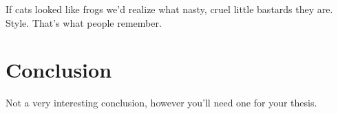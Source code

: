 \begin{savequote}[45mm]
If cats looked like frogs we'd realize what nasty, cruel little bastards they are. Style. That's what people remember.
\end{savequote}

\chapter{Conclusion}

Not a very interesting conclusion, however you'll need one for your thesis.
